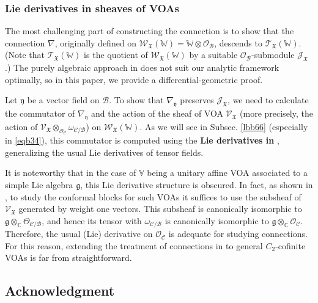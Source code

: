 \documentclass[11pt,b5paper,notitlepage]{article}
\theoremstyle{definition}
\theoremstyle{plain}
\newcommand{\scr}{\mathscr}
\newcommand{\gk}{\mathfrak g}
\newcommand{\yk}{\mathfrak y}
\newcommand{\Vbb}{\mathbb V}
\newcommand{\Wbb}{\mathbb W}
\newcommand{\Cbb}{\mathbb C}
\newcommand{\<}{\left\langle}
\renewcommand{\>}{\right\rangle}
\newcommand{\MO}{\mathcal{O}}
\newcommand{\MC}{\mathcal{C}}
\newcommand{\MB}{\mathcal{B}}
\newcommand{\fx}{\mathfrak{X}}
\newcommand{\SJ}{\mathscr{J}}
\numberwithin{equation}{subsection}
\begin{document}
\subsubsection*{Lie derivatives in sheaves of VOAs}


The most challenging part of constructing the connection  is to show that the connection $\nabla$, originally defined on $\scr W_\fx(\Wbb)=\Wbb\otimes\MO_\MB$, descends to $\scr T_\fx(\Wbb)$. (Note that $\scr T_\fx(\Wbb)$ is the quotient of $\scr W_\fx(\Wbb)$ by a suitable $\MO_\MB$-submodule $\SJ_\fx$.) The purely algebraic approach in \cite{FB04} does not suit our analytic framework optimally, so in this paper, we provide a differential-geometric proof.

Let $\yk$ be a vector field on $\MB$. To show that $\nabla_\yk$ preserves $\SJ_\fx$, we need to calculate the commutator of $\nabla_\yk$ and the action of the sheaf of VOA $\scr V_\fx$ (more precisely, the action of $\scr V_\fx\otimes_{\MO_\MC}\omega_{\MC/\MB}$) on $\scr W_\fx(\Wbb)$. As we will see in Subsec. \ref{lbb66} (especially in \eqref{eqb34}), this commutator is computed using the \textbf{Lie derivatives in \pmb{$\scr V_\fx\otimes\omega_{\MC/\MB}$}}, generalizing the usual Lie derivatives of tensor fields. 


It is noteworthy that in the case of $\Vbb$ being a unitary affine VOA associated to a simple Lie algebra $\gk$, this Lie derivative structure is obscured. In fact, as shown in \cite{TUY}, to study the conformal blocks for such VOAs it suffices to use the subsheaf of $\scr V_\fx$ generated by weight one vectors. This subsheaf is canonically isomorphic to $\gk\otimes_\Cbb\Theta_{\MC/\MB}$, and hence its tensor with $\omega_{\MC/\MB}$ is canonically isomorphic to $\gk\otimes_\Cbb\MO_\MC$. Therefore, the usual (Lie) derivative on $\MO_\MC$ is adequate for studying connections. For this reason, extending the treatment of connections in \cite{TUY} to general $C_2$-cofinite VOAs is far from straightforward.




\subsection*{Acknowledgment}
\end{document}
